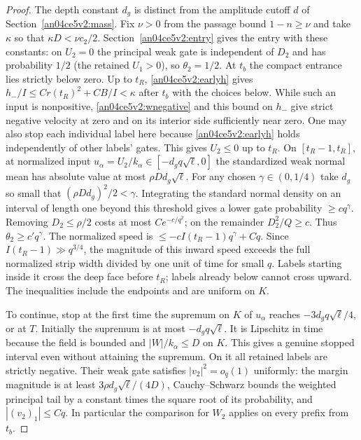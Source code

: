 \documentclass[11pt]{article}
\begin{document}
\begin{proof}
The depth constant $d_g$ is distinct from the amplitude cutoff $d$ of Section~\ref{an04ce5v2:mass}. Fix $\nu>0$ from the passage bound $1-n\ge\nu$ and take $\kappa$ so that $\kappa D<\nu c_2/2$. Section~\ref{an04ce5v2:entry} gives the entry with these constants: on $U_2=0$ the principal weak gate is independent of $D_2$ and has probability $1/2$ (the retained $U_1>0$), so $\theta_2=1/2$. At $t_b$ the compact entrance lies strictly below zero. Up to $t_R$, \eqref{an04ce5v2:earlyh} gives $h_-/I\le C r(t_R)^2+CB/I<\kappa$ after $t_b$ with the choices below. While such an input is nonpositive, \eqref{an04ce5v2:wnegative} and this bound on $h_-$ give strict negative velocity at zero and on its interior side sufficiently near zero. One may also stop each individual label here because \eqref{an04ce5v2:earlyh} holds independently of other labels' gates. This gives $U_2\le0$ up to $t_R$. On $[t_R-1,t_R]$, at normalized input $u_\alpha=U_2/k_\alpha\in[-d_gq\sqrt\ell,0]$ the standardized weak normal mean has absolute value at most $\rho Dd_g\sqrt\ell$. For any chosen $\gamma\in(0,1/4)$ take $d_g$ so small that $(\rho Dd_g)^2/2<\gamma$. Integrating the standard normal density on an interval of length one beyond this threshold gives a lower gate probability $\ge c q^\gamma$. Removing $D_2\le\rho/2$ costs at most $Ce^{-c/q^2}$; on the remainder $D_2^2/Q\ge c$. Thus $\theta_2\ge c' q^\gamma$. The normalized speed is $\le-c I(t_R-1)q^\gamma+Cq$. Since $I(t_R-1)\gg q^{3/4}$, the magnitude of this inward speed exceeds the full normalized strip width divided by one unit of time for small $q$. Labels starting inside it cross the deep face before $t_R$; labels already below cannot cross upward. The inequalities include the endpoints and are uniform on $K$.

To continue, stop at the first time the supremum on $K$ of $u_\alpha$ reaches $-3d_gq\sqrt\ell/4$, or at $T$. Initially the supremum is at most $-d_gq\sqrt\ell$. It is Lipschitz in time because the field is bounded and $|W|/k_\alpha\le D$ on $K$. This gives a genuine stopped interval even without attaining the supremum. On it all retained labels are strictly negative. Their weak gate satisfies $|v_2|^2=o_q(1)$ uniformly: the margin magnitude is at least $3\rho d_g\sqrt\ell/(4D)$, Cauchy--Schwarz bounds the weighted principal tail by a constant times the square root of its probability, and $|(v_2)_1|\le Cq$. In particular the comparison for $W_2$ applies on every prefix from $t_b$.


\end{proof}
\end{document}

